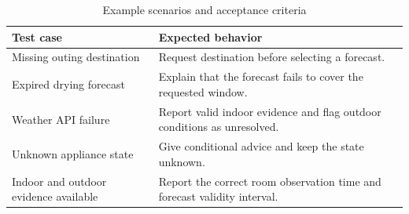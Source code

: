 \begin{table}[t]
\caption{Example scenarios and acceptance criteria}
\label{tab:scenarios}
\centering\footnotesize
\begin{tabular}{@{}p{}p{}@{}}
\hline
Test case & Expected behavior \\
\hline
Missing outing destination & Request destination before selecting a forecast. \\
Expired drying forecast & Explain that the forecast fails to cover the requested window. \\
Weather API failure & Report valid indoor evidence and flag outdoor conditions as unresolved. \\
Unknown appliance state & Give conditional advice and keep the state unknown. \\
Indoor and outdoor evidence available & Report the correct room observation time and forecast validity interval. \\
\hline
\end{tabular}
\end{table}
